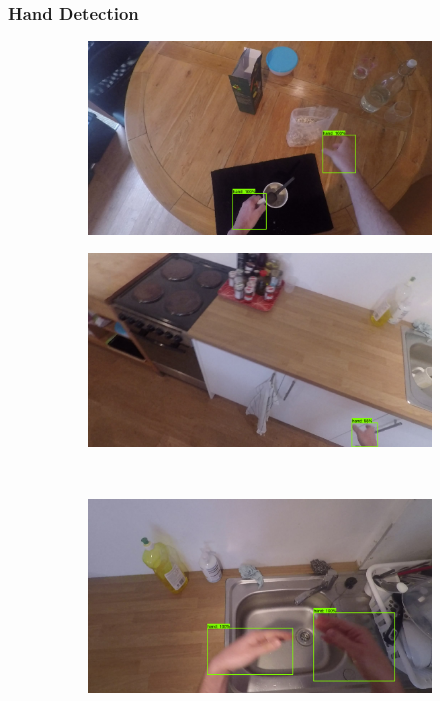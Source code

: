 \documentclass[12pt]{report}
\begin{document}
\subsubsection{Hand Detection}

\begin{figure}[t]
\begin{subfigure}{.5\textwidth}
\centerline{\includegraphics[width=.95\linewidth]{figure/handEval1.png}}
\label{handsA}
\end{subfigure}
\begin{subfigure}{.5\textwidth}
\centerline{\includegraphics[width=.95\linewidth]{figure/handEval2.png}}
\label{handsB}
\end{subfigure}
\\ 
\begin{subfigure}{.5\textwidth}
\centerline{\includegraphics[width=.95\linewidth]{figure/handEval3.png}}

\end{subfigure}
\end{figure}
\end{document}
